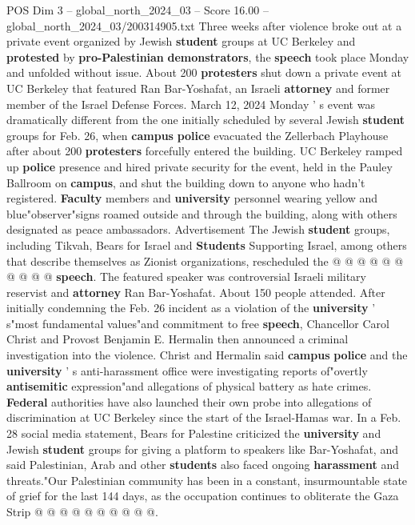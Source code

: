 \begin{textsample}{POS Dim 3 – global\_north\_2024\_03 – Score 16.00 – global\_north\_2024\_03/200314905.txt}  \label{ex:f3_pos_270}
Three weeks after violence broke out at a private event organized by Jewish \textbf{student} groups at UC Berkeley and \textbf{protested} by \textbf{pro-Palestinian} \textbf{demonstrators}, the \textbf{speech} took place Monday and unfolded without issue.
About 200 \textbf{protesters} shut down a private event at UC Berkeley that featured Ran Bar-Yoshafat, an Israeli \textbf{attorney} and former member of the Israel Defense Forces.
March 12, 2024 Monday ' s event was dramatically different from the one initially scheduled by several Jewish \textbf{student} groups for Feb. 26, when \textbf{campus} \textbf{police} evacuated the Zellerbach Playhouse after about 200 \textbf{protesters} forcefully entered the building.
UC Berkeley ramped up \textbf{police} presence and hired private security for the event, held in the Pauley Ballroom on \textbf{campus}, and shut the building down to anyone who hadn't registered. \textbf{Faculty} members and \textbf{university} personnel wearing yellow and blue"observer"signs roamed outside and through the building, along with others designated as peace ambassadors.
Advertisement The Jewish \textbf{student} groups, including Tikvah, Bears for Israel and \textbf{Students} Supporting Israel, among others that describe themselves as Zionist organizations, rescheduled the @ @ @ @ @ @ @ @ @ @ \textbf{speech}.
The featured speaker was controversial Israeli military reservist and \textbf{attorney} Ran Bar-Yoshafat.
About 150 people attended.
After initially condemning the Feb. 26 incident as a violation of the \textbf{university} ' s"most fundamental values"and commitment to free \textbf{speech}, Chancellor Carol Christ and Provost Benjamin E.
Hermalin then announced a criminal investigation into the violence.
Christ and Hermalin said \textbf{campus} \textbf{police} and the \textbf{university} ' s anti-harassment office were investigating reports of"overtly \textbf{antisemitic} expression"and allegations of physical battery as hate crimes. \textbf{Federal} authorities have also launched their own probe into allegations of discrimination at UC Berkeley since the start of the Israel-Hamas war.
In a Feb. 28 social media statement, Bears for Palestine criticized the \textbf{university} and Jewish \textbf{student} groups for giving a platform to speakers like Bar-Yoshafat, and said Palestinian, Arab and other \textbf{students} also faced ongoing \textbf{harassment} and threats."Our Palestinian community has been in a constant, insurmountable state of grief for the last 144 days, as the occupation continues to obliterate the Gaza Strip @ @ @ @ @ @ @ @ @ @.

\end{textsample}
